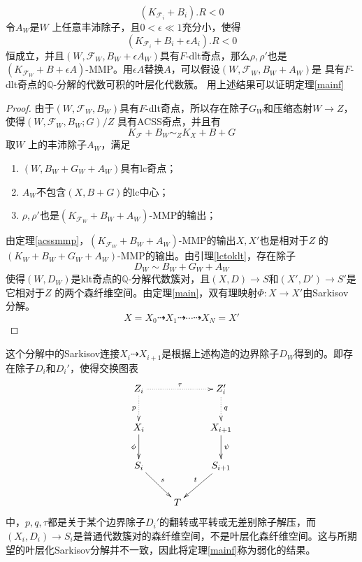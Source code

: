 \[ (K_{\mathcal{F}_{i}}+B_{i}).R<0 \]
令$A_{W}$是$W$ 上任意丰沛除子，且$0<\epsilon\ll 1$充分小，使得
\[ (K_{\mathcal{F}_{i}}+B_{i}+\epsilon A_{i}).R<0 \]
恒成立，并且$(W,\mathcal{F}_{W},B_{W}+\epsilon A_{W})$具有$F$-dlt奇点，那么$\rho,\rho'$也是$(K_{\mathcal{F}_{W}}+B+\epsilon A)$-MMP。用$\epsilon A$替换$A$，可以假设$(W,\mathcal{F}_{W},B_{W}+A_{W})$是 具有$F$-dlt奇点的$\mathbb{Q}$-分解的代数可积的叶层化代数簇。 
用上述结果可以证明定理\ref{mainf}
\begin{proof}
  由于$(W,\mathcal{F}_{W},B_{W})$具有$F$-dlt奇点，所以存在除子$G_{W}$和压缩态射$W\to Z$，使得$(W,\mathcal{F}_{W},B_{W};G)/Z$ 具有ACSS奇点，并且有
  \[ K_{\mathcal{F}}+B_{W} \sim_{Z} K_{X}+B+G \]
 取$W$ 上的丰沛除子$A_{W}$，满足
 \begin{enumerate}
   \item $(W,B_{W}+G_{W}+A_{W}) $具有lc奇点；
   \item $A_{W}$不包含$(X,B+G)$的lc中心；
   \item $\rho,\rho' $也是$(K_{\mathcal{F}_{W}}+B_{W}+A_{W})$-MMP的输出；
 \end{enumerate}
 由定理\ref{acssmmp}，$(K_{\mathcal{F}_{W}}+B_{W}+A_{W})$-MMP的输出$X,X'$也是相对于$Z$ 的$(K_{W}+B_{W}+G_{W}+A_{W})$-MMP的输出。由引理\ref{lctoklt}，存在除子
\[ D_{W}\sim B_{W}+G_{W}+A_{W} \]
使得$(W,D_{W})$是klt奇点的$\mathbb{Q}$-分解代数簇对，且$(X,D)\to S $和$(X',D')\to S' $是它相对于$Z$ 的两个森纤维空间。由定理\ref{main}，双有理映射$\Phi:X\to X'$由Sarkisov分解。 
\[ X=X_{0}\dashrightarrow X_{1}\dashrightarrow \cdots \dashrightarrow X_{N}=X' \]
\end{proof}

\begin{remark}
 这个分解中的Sarkisov连接$X_{i}\dashrightarrow X_{i+1}$是根据上述构造的边界除子$D_{W}$得到的。即存在除子$D_{i}$和$D_{i}'$，使得交换图表
  \[ \xymatrix{
      Z_{i}\ar@{.>}[d]_p\ar@{.>}[rr]^{\tau}&&Z_{i}'\ar@{.>}[d]^q\\
      X_{i}\ar[d]_{\phi}&&X_{i+1}\ar[d]^\psi\\
      S_{i}\ar[rd]^s&&S_{i+1}\ar[ld]_t\\
      &T&} \]
      中，$p,q,\tau$都是关于某个边界除子$D_{i}'$的翻转或平转或无差别除子解压，而$(X_{i},D_{i})\to S_{i}$是普通代数簇对的森纤维空间，不是叶层化森纤维空间。这与所期望的叶层化Sarkisov分解并不一致，因此将定理\ref{mainf}称为弱化的结果。
\end{remark}

